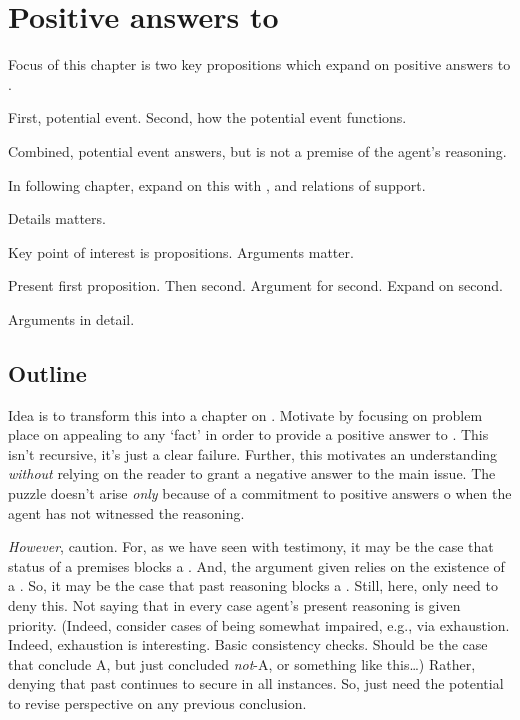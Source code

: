 \chapter{Positive answers to \qzS{}}
\label{cha:positive-answers}

\begin{note}
  Focus of this chapter is two key propositions which expand on positive answers to \qzS{}.

  First, potential event.
  Second, how the potential event functions.

  Combined, potential event answers, but is not a premise of the agent's reasoning.

  In following chapter, expand on this with , and relations of support.
\end{note}

\begin{note}
  Details matters.

  Key point of interest is propositions.
  Arguments matter.

  Present first proposition.
  Then second.
  Argument for second.
  Expand on second.

  Arguments in detail.
\end{note}

\section{Outline}
\label{sec:outline}

\begin{note}
  Idea is to transform this into a chapter on \fc{}.
  Motivate \fc{} by focusing on problem  place on appealing to any `fact' in order to provide a positive answer to \qzS{}.
  This isn't recursive, it's just a clear failure.
  Further, this motivates an understanding \emph{without} relying on the reader to grant a negative answer to the main issue.
  The puzzle doesn't arise \emph{only} because of a commitment to positive answers o \qzS{} when the agent has not witnessed the reasoning.

  \emph{However}, caution.
  For, as we have seen with testimony, it may be the case that status of a premises blocks a \requ{}.
  And, the argument given relies on the existence of a \requ{}.
  So, it may be the case that past reasoning blocks a \requ{}.
  Still, here, only need to deny this.
  Not saying that in every case agent's present reasoning is given priority.
  (Indeed, consider cases of being somewhat impaired, e.g., via exhaustion.
  Indeed, exhaustion is interesting.
  Basic consistency checks.
  Should be the case that conclude A, but just concluded \emph{not}-A, or something like this\dots)
  Rather, denying that past continues to secure in all instances.
  So, just need the potential to revise perspective on any previous conclusion.
\end{note}

